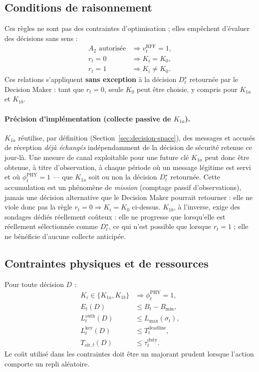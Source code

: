 \documentclass[conference,a4paper]{IEEEtran}
\begin{document}
\subsection{Conditions de raisonnement}
Ces règles ne sont pas des contraintes d'optimisation ; elles empêchent d'évaluer des décisions sans sens :
\begin{align}
A_2\text{ autorisée} &\Rightarrow v_t^{\mathrm{RFF}}=1,\\
r_t=0 &\Rightarrow K_i=K_0,\\
r_t=1 &\Rightarrow K_i\neq K_0.
\end{align}
Ces relations s'appliquent \textbf{sans exception} à la décision $D_t^\star$ retournée par le Decision Maker : tant que $r_t=0$, seule $K_0$ peut être choisie, y compris pour $K_{1a}$ et $K_{1b}$.

\paragraph{Précision d'implémentation (collecte passive de $K_{1a}$).} $K_{1a}$ réutilise, par définition (Section~\ref{sec:decision-space}), des messages et accusés de réception \emph{déjà échangés} indépendamment de la décision de sécurité retenue ce jour-là. Une mesure de canal exploitable pour une future clé $K_{1a}$ peut donc être obtenue, à titre d'observation, à chaque période où un message légitime est servi et où $\phi_t^{\mathrm{PHY}}=1$ — que $K_{1a}$ soit ou non la décision $D_t^\star$ retournée. Cette accumulation est un phénomène de \emph{mission} (comptage passif d'observations), jamais une décision alternative que le Decision Maker pourrait retourner : elle ne viole donc pas la règle $r_t=0\Rightarrow K_i=K_0$ ci-dessus. $K_{1b}$, à l'inverse, exige des sondages dédiés réellement coûteux : elle ne progresse que lorsqu'elle est réellement sélectionnée comme $D_t^\star$, ce qui n'est possible que lorsque $r_t=1$ ; elle ne bénéficie d'aucune collecte anticipée.

\subsection{Contraintes physiques et de ressources}
Pour toute décision $D$ :
\begin{align}
K_i\in\{K_{1a},K_{1b}\}&\Rightarrow \phi_t^{\mathrm{PHY}}=1,
\label{cons:phy}\\
E_t(D)&\leq B_t-B_{\min},
\label{cons:battery}\\
L_t^{\mathrm{auth}}(D)&\leq L_{\max}(\sigma_t),
\label{cons:authlat}\\
L_t^{\mathrm{key}}(D)&\leq T_t^{\mathrm{deadline}},
\label{cons:keylat}\\
T_{\mathrm{air},t}(D)&\leq\tau_t^{\mathrm{duty}}.
\label{cons:duty}
\end{align}
Le coût utilisé dans les contraintes doit être un majorant prudent lorsque l'action comporte un repli aléatoire.
\end{document}
